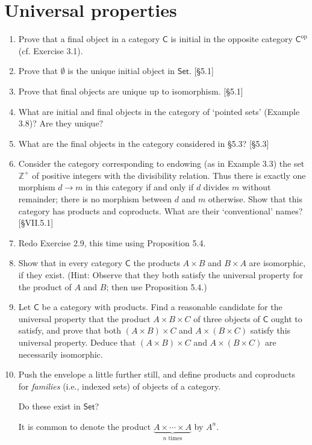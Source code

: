 \section{Universal properties}
\begin{enumerate}
    \item Prove that a final object in a category $\mathsf{C}$ is initial in the opposite category $\mathsf{C}^{\text{op}}$ (cf. Exercise 3.1).
    \item Prove that $\emptyset$ is the unique initial object in $\mathsf{Set}$. [\S5.1]
    \item Prove that final objects are unique up to isomorphism. [\S5.1]
    \item What are initial and final objects in the category of `pointed sets' (Example 3.8)? Are they unique?
    \item What are the final objects in the category considered in \S5.3? [\S5.3]
    \item Consider the category corresponding to endowing (as in Example 3.3) the set $\mathbb{Z}^+$ of positive integers with the divisibility relation. Thus there is exactly one morphism $d \to m$ in this category if and only if $d$ divides $m$ without remainder; there is no morphism between $d$ and $m$ otherwise. Show that this category has products and coproducts. What are their `conventional' names? [\S VII.5.1]
    \item Redo Exercise 2.9, this time using Proposition 5.4.
    \item Show that in every category $\mathsf{C}$ the products $A \times B$ and $B \times A$ are isomorphic, if they exist. (Hint: Observe that they both satisfy the universal property for the product of $A$ and $B$; then use Proposition 5.4.)
    \item Let $\mathsf{C}$ be a category with products. Find a reasonable candidate for the universal property that the product $A \times B \times C$ of three objects of $\mathsf{C}$ ought to satisfy, and prove that both $(A \times B) \times C$ and $A \times (B \times C)$ satisfy this universal property. Deduce that $(A \times B) \times C$ and $A \times (B \times C)$ are necessarily isomorphic.
    \item Push the envelope a little further still, and define products and coproducts for \textit{families} (i.e., indexed sets) of objects of a category.

          Do these exist in $\mathsf{Set}$?

          It is common to denote the product $\underbrace{A \times \cdots \times A}_{n \text{ times}}$ by $A^n$.


\end{enumerate}
